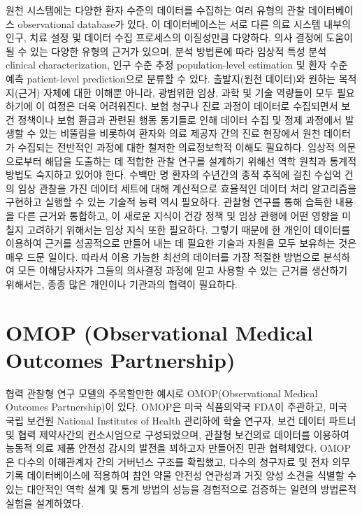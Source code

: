 \documentclass[10.5pt]{book}
\theoremstyle{definition}
\theoremstyle{definition}
\theoremstyle{definition}
\theoremstyle{remark}
\begin{document}
원천 시스템에는 다양한 환자 수준의 데이터를 수집하는 여러 유형의 관찰
데이터베이스 observational database가 있다. 이 데이터베이스는 서로 다른
의료 시스템 내부의 인구, 치료 설정 및 데이터 수집 프로세스의 이질성만큼
다양하다. 의사 결정에 도움이 될 수 있는 다양한 유형의 근거가 있으며,
분석 방법론에 따라 임상적 특성 분석 clinical characterization, 인구 수준
추정 population-level estimation 및 환자 수준 예측 patient-level
prediction으로 분류할 수 있다. 출발지(원천 데이터)와 원하는 목적지(근거)
자체에 대한 이해뿐 아니라, 광범위한 임상, 과학 및 기술 역량들이 모두
필요하기에 이 여정은 더욱 어려워진다. 보험 청구나 진료 과정이 데이터로
수집되면서 보건 정책이나 보험 환급과 관련된 행동 동기들로 인해 데이터
수집 및 정제 과정에서 발생할 수 있는 비뚤림을 비롯하여 환자와 의료
제공자 간의 진료 현장에서 원천 데이터가 수집되는 전반적인 과정에 대한
철저한 의료정보학적 이해도 필요하다. 임상적 의문으로부터 해답을 도출하는
데 적합한 관찰 연구를 설계하기 위해선 역학 원칙과 통계적 방법도 숙지하고
있어야 한다. 수백만 명 환자의 수년간의 종적 추적에 걸친 수십억 건의 임상
관찰을 가진 데이터 세트에 대해 계산적으로 효율적인 데이터 처리
알고리즘을 구현하고 실행할 수 있는 기술적 능력 역시 필요하다. 관찰형
연구를 통해 습득한 내용을 다른 근거와 통합하고, 이 새로운 지식이 건강
정책 및 임상 관행에 어떤 영향을 미칠지 고려하기 위해서는 임상 지식 또한
필요하다. 그렇기 때문에 한 개인이 데이터를 이용하여 근거를 성공적으로
만들어 내는 데 필요한 기술과 자원을 모두 보유하는 것은 매우 드문 일이다.
따라서 이용 가능한 최선의 데이터를 가장 적절한 방법으로 분석하여 모든
이해당사자가 그들의 의사결정 과정에 믿고 사용할 수 있는 근거를 생산하기
위해서는, 종종 많은 개인이나 기관과의 협력이 필요하다.

\section{OMOP (Observational Medical Outcomes
Partnership)}\label{omop-observational-medical-outcomes-partnership}

협력 관찰형 연구 모델의 주목할만한 예시로 OMOP(Observational Medical
Outcomes Partnership)이 있다. OMOP은 미국 식품의약국 FDA이 주관하고,
미국 국립 보건원 National Institutes of Health 관리하에 학술 연구자,
보건 데이터 파트너 및 협력 제약사간의 컨소시엄으로 구성되었으며, 관찰형
보건의료 데이터를 이용하여 능동적 의료 제품 안전성 감시의 발전을
꾀하고자 만들어진 민관 협력체였다. \citep{stang2010omop} OMOP은 다수의
이해관계자 간의 거버넌스 구조를 확립했고, 다수의 청구자료 및 전자 의무
기록 데이터베이스에 적용하여 참인 약물 안전성 연관성과 거짓 양성 소견을
식별할 수 있는 대안적인 역학 설계 및 통계 방법의 성능을 경험적으로
검증하는 일련의 방법론적 실험을 설계하였다.
\end{document}
